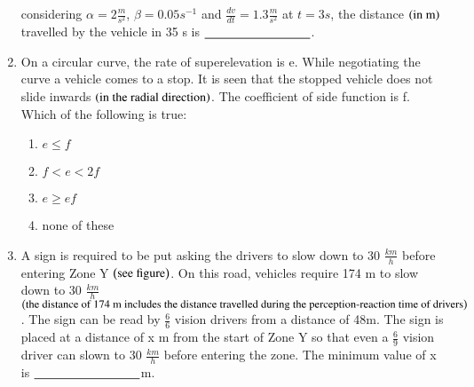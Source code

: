 \documentclass[journal,12pt,onecolumn]{IEEEtran}
\theoremstyle{remark}
\begin{document}
\begin{enumerate}
considering $\alpha = 2 \frac{m}{s^2}$, $\beta = 0.05 s^{-1}$ and $\frac{dv}{dt} = 1.3 \frac{m}{s^2}$ at $t = 3 s$, the distance $\left(\text{in m}\right)$ travelled by the vehicle in 35 s is $\makebox[3cm][l]{\underline{\hspace{3cm}}}$.

\item On a circular curve, the rate of superelevation is e. While negotiating the curve a vehicle comes to a stop. It is seen that the stopped vehicle does not slide inwards $\left(\text{in the radial direction}\right)$. The coefficient of side function is f. Which of the following is true:
\begin{enumerate}
    \item $e \leq f$
    \item $f < e < 2f$
    \item $e \geq ef$
    \item none of these
\end{enumerate}
\item A sign is required to be put asking the drivers to slow down to 30 $\frac{km}{h}$
before entering Zone Y $\left(\text{see figure}\right)$. On this road, vehicles require 174 m to slow down to 30 $\frac{km}{h}$ $\left(\text{the distance of 174 m includes the distance travelled during the perception-reaction time of drivers}\right)$. The sign can be read by $\frac{6}{6}$ vision drivers from a distance of 48m. The sign is placed at a distance of x m from the start of Zone Y so that even a $\frac{6}{9}$ vision driver can slown to 30 $\frac{km}{h}$ before entering the zone. The minimum value of x is $\makebox[3cm][l]{\underline{\hspace{3cm}}} $m.\\
\begin{figure}[!ht]
\centering
\resizebox{0.4\textwidth}{!}{%

}%
\end{figure}


\end{enumerate}
\end{document}
